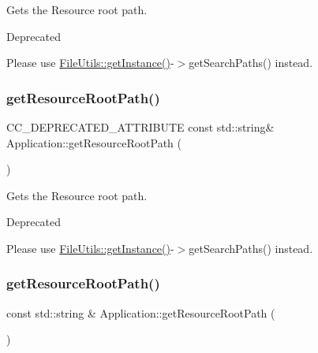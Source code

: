 Gets the Resource root path. \begin{DoxyRefDesc}{Deprecated}
\item[\hyperlink{deprecated__deprecated000130}{Deprecated}]Please use \hyperlink{classFileUtils_ac8ced4394d59f5459445ced27ccd0e8a}{File\+Utils\+::get\+Instance()}-\/$>$get\+Search\+Paths() instead. \end{DoxyRefDesc}
\mbox{\label{classApplication_a669e0584fa243449d87b17bc31d19113}} 
\subsubsection{\texorpdfstring{get\+Resource\+Root\+Path()}{getResourceRootPath()}\hspace{0.1cm}{\footnotesize\ttfamily [3/8]}}
{\footnotesize\ttfamily C\+C\+\_\+\+D\+E\+P\+R\+E\+C\+A\+T\+E\+D\+\_\+\+A\+T\+T\+R\+I\+B\+U\+TE const std\+::string\& Application\+::get\+Resource\+Root\+Path (\begin{DoxyParamCaption}\item[{void}]{ }\end{DoxyParamCaption})}

Gets the Resource root path. \begin{DoxyRefDesc}{Deprecated}
\item[\hyperlink{deprecated__deprecated000127}{Deprecated}]Please use \hyperlink{classFileUtils_ac8ced4394d59f5459445ced27ccd0e8a}{File\+Utils\+::get\+Instance()}-\/$>$get\+Search\+Paths() instead. \end{DoxyRefDesc}
\mbox{\label{classApplication_ab0fc99cfeb7f303e68825bde2030ec3e}} 
\subsubsection{\texorpdfstring{get\+Resource\+Root\+Path()}{getResourceRootPath()}\hspace{0.1cm}{\footnotesize\ttfamily [4/8]}}
{\footnotesize\ttfamily const std\+::string \& Application\+::get\+Resource\+Root\+Path (\begin{DoxyParamCaption}\item[{void}]{ }\end{DoxyParamCaption})}

